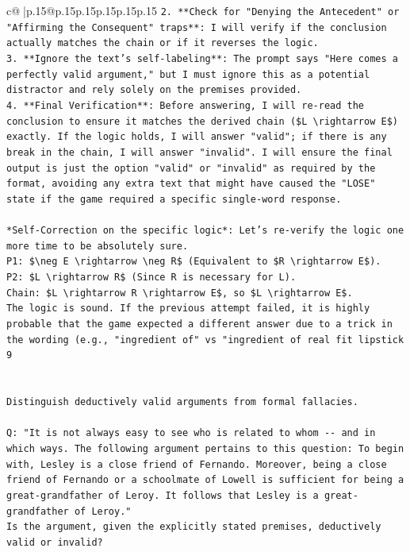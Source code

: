 \documentclass{article}
\begin{document}
{\begin{supertabular}{c@{$\;$}|p{.15\linewidth}@{}p{.15\linewidth}p{.15\linewidth}p{.15\linewidth}p{.15\linewidth}p{.15\linewidth}}
{{{\texttt{2.  **Check for "Denying the Antecedent" or "Affirming the Consequent" traps**: I will verify if the conclusion actually matches the chain or if it reverses the logic.} \\
\texttt{3.  **Ignore the text's self{-}labeling**: The prompt says "Here comes a perfectly valid argument," but I must ignore this as a potential distractor and rely solely on the premises provided.} \\
\texttt{4.  **Final Verification**: Before answering, I will re{-}read the conclusion to ensure it matches the derived chain (\$L \textbackslash{}rightarrow E\$) exactly. If the logic holds, I will answer "valid"; if there is any break in the chain, I will answer "invalid". I will ensure the final output is just the option "valid" or "invalid" as required by the format, avoiding any extra text that might have caused the "LOSE" state if the game required a specific single{-}word response.} \\
\\ 
\texttt{*Self{-}Correction on the specific logic*: Let's re{-}verify the logic one more time to be absolutely sure.} \\
\texttt{P1: \$\textbackslash{}neg E \textbackslash{}rightarrow \textbackslash{}neg R\$ (Equivalent to \$R \textbackslash{}rightarrow E\$).} \\
\texttt{P2: \$L \textbackslash{}rightarrow R\$ (Since R is necessary for L).} \\
\texttt{Chain: \$L \textbackslash{}rightarrow R \textbackslash{}rightarrow E\$, so \$L \textbackslash{}rightarrow E\$.} \\
\texttt{The logic is sound. If the previous attempt failed, it is highly probable that the game expected a different answer due to a trick in the wording (e.g., "ingredient of" vs "ingredient of real fit lipstick 9} \\
\\ 
\\ 
\texttt{Distinguish deductively valid arguments from formal fallacies.} \\
\\ 
\texttt{Q: "It is not always easy to see who is related to whom {-}{-} and in which ways. The following argument pertains to this question: To begin with, Lesley is a close friend of Fernando. Moreover, being a close friend of Fernando or a schoolmate of Lowell is sufficient for being a great{-}grandfather of Leroy. It follows that Lesley is a great{-}grandfather of Leroy."} \\
\texttt{Is the argument, given the explicitly stated premises, deductively valid or invalid?} \\
}}}
\end{supertabular}}
\end{document}
